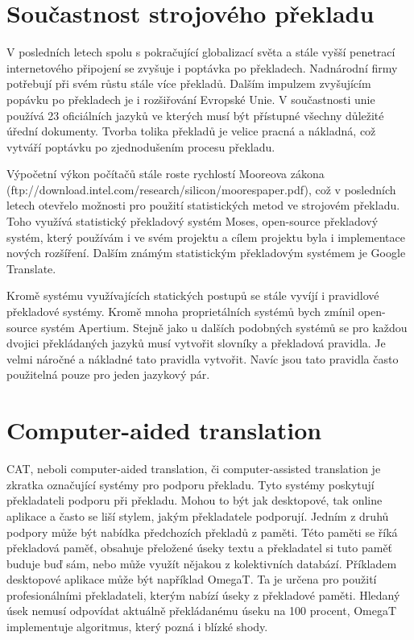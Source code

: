 \documentclass[12pt,a4paper]{report}
\begin{document}
\section{Součastnost strojového překladu}
V posledních letech spolu s pokračující globalizací světa a stále vyšší penetrací internetového připojení se zvyšuje i poptávka po překladech. Nadnárodní firmy potřebují při svém růstu stále více překladů. Dalším impulzem zvyšujícím popávku po překladech je i rozšiřování Evropské Unie. V součastnosti unie používá 23 oficiálních jazyků ve kterých musí být přístupné všechny důležité úřední dokumenty. Tvorba tolika překladů je velice pracná a nákladná, což vytváří poptávku po zjednodušením procesu překladu.

Výpočetní výkon počítačů stále roste rychlostí Mooreova zákona (ftp://download.intel.com/research/silicon/moorespaper.pdf), což v posledních letech otevřelo možnosti pro použití statistických metod ve strojovém překladu. Toho využívá statistický překladový systém Moses, open-source překladový systém, který používám i ve svém projektu a cílem projektu byla i implementace nových rozšíření. Dalším známým statistickým překladovým systémem je Google Translate.

Kromě systému využívajících statických postupů se stále vyvíjí i pravidlové překladové systémy. Kromě mnoha proprietálních systémů bych zmínil open-source systém Apertium. Stejně jako u dalších podobných systémů se pro každou dvojici překládaných jazyků musí vytvořit slovníky a překladová pravidla. Je velmi náročné a nákladné tato pravidla vytvořit. Navíc jsou tato pravidla často použitelná pouze pro jeden jazykový pár.

\section{Computer-aided translation}
CAT, neboli computer-aided translation, či computer-assisted translation je zkratka označující systémy pro podporu překladu. Tyto systémy poskytují překladateli podporu při překladu. Mohou to být jak desktopové, tak online aplikace a často se liší stylem, jakým překladatele podporují. Jedním z druhů podpory může být nabídka předchozích překladů z paměti. Této paměti se říká překladová paměť, obsahuje přeložené úseky textu a překladatel si tuto paměť buduje buď sám, nebo může využít nějakou z kolektivních databází. Příkladem desktopové aplikace může být například OmegaT. Ta je určena pro použití profesionálními překladateli, kterým nabízí úseky z překladové paměti. Hledaný úsek nemusí odpovídat aktuálně překládanému úseku na 100 procent, OmegaT implementuje algoritmus, který pozná i blízké shody.
\end{document}
